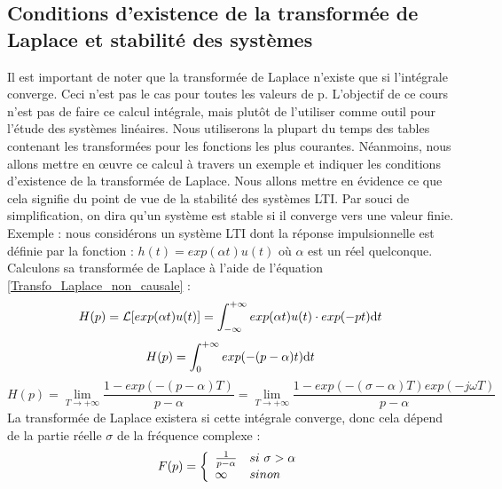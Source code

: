 \documentclass[]{book}
\begin{document}
{	\subsection{Conditions d'existence de la transformée de Laplace et stabilité des systèmes}
	Il est important de noter que la transformée de Laplace n'existe que si l'intégrale converge. Ceci n'est pas le cas pour toutes les valeurs de p.
	L'objectif de ce cours n'est pas de faire ce calcul intégrale, mais plutôt de l'utiliser comme outil pour l'étude des systèmes linéaires. Nous utiliserons la plupart du temps des tables contenant les transformées pour les fonctions les plus courantes. Néanmoins, nous allons mettre en œuvre ce calcul à travers un exemple et indiquer les conditions d'existence de la transformée de Laplace. Nous allons mettre en évidence ce que cela signifie du point de vue de la stabilité des systèmes LTI. Par souci de simplification, on dira qu'un système est stable si il converge vers une valeur finie.
	Exemple : nous considérons un système LTI dont la réponse impulsionnelle est définie par la fonction : $h(t) = exp(\alpha t)u(t) $ où $\alpha$ est un réel quelconque.
	Calculons sa transformée de Laplace à l'aide de l'équation \ref{Transfo_Laplace_non_causale} :
	\begin{equation*}
	H(p) = \mathcal{L}[exp(\alpha t)u(t)] = \int_{-\infty}^{+\infty}exp(\alpha t)u(t) \cdot exp(-pt) \mathrm{d} t
	\end{equation*}
	\begin{equation*}
	H(p) = \int_{0}^{+\infty}exp(-(p-\alpha) t) \mathrm{d} t
	\end{equation*}
	\begin{equation*}
	H(p) = \lim_{T \to +\infty} \frac{1-exp(-(p-\alpha)T)}{p-\alpha} = \lim_{T \to +\infty} \frac{1-exp(-(\sigma-\alpha)T)exp(-j\omega T)}{p-\alpha}
	\end{equation*}
	La transformée de Laplace existera si cette intégrale converge, donc cela dépend de la partie réelle $\sigma$ de la fréquence complexe :
	\begin{equation}\label{}
	F(p) = \left \{
	\begin{array}{l l}
	\frac{1}{p-\alpha}  & si~\sigma>\alpha \\
	\infty   & sinon \\
	\end{array}
	\right .	 	
	\end{equation}
	
}
\end{document}

